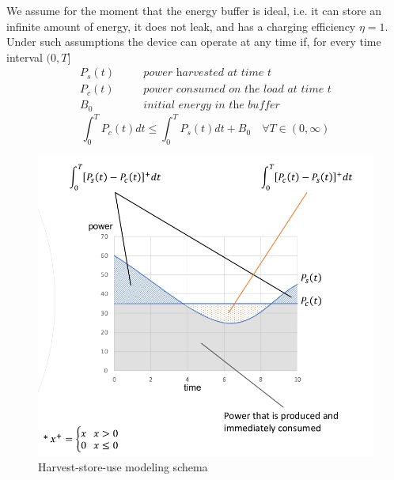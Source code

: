 \begin{paracol}{2}
   
   We assume for the moment that the energy buffer is ideal, i.e. it can store an infinite amount of energy, it does not leak, and has a charging efficiency $\eta = 1$.\\
   Under such assumptions the device can operate at any time if, for every time interval $(0,T]$
   \begin{align*}
      P_s(t) & \quad & \textit{power harvested at time t}\\
      P_c(t) & \quad & \textit{power consumed on the load at time t}\\
      B_0 & \quad & \textit{initial energy in the buffer}
   \end{align*}
   \[
      \int_0^T P_c(t)dt \leq \int_0^T P_s(t)dt + B_0 \quad \forall T \in (0, \infty)
      \]
      
      \switchcolumn
      \begin{figure}[htbp]
         \centering
         \includegraphics{images/harveststoreuse2.png}
         \caption{Harvest-store-use modeling schema}
         \label{fig:harveststoreuse2}
      \end{figure}
   \end{paracol}

